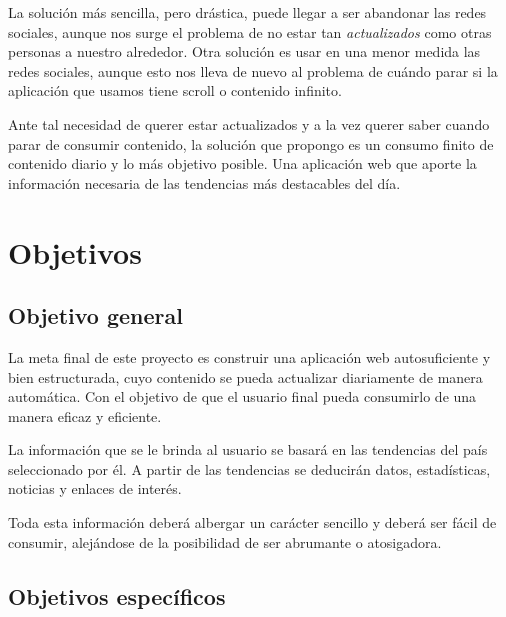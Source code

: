 \vspace{0.3cm}

La solución más sencilla, pero drástica, puede llegar a ser abandonar las redes sociales, aunque nos surge el problema de no estar tan \textit{actualizados} como otras personas a nuestro alrededor. Otra solución es usar en una menor medida las redes sociales, aunque esto nos lleva de nuevo al problema de cuándo parar si la aplicación que usamos tiene scroll o contenido infinito.

\vspace{0.3cm}

Ante tal necesidad de querer estar actualizados y a la vez querer saber cuando parar de consumir contenido, la solución que propongo es un consumo finito de contenido diario y lo más objetivo posible. Una aplicación web que aporte la información necesaria de las tendencias más destacables del día.

\section{Objetivos}

\subsection{Objetivo general}
La meta final de este proyecto es construir una aplicación web autosuficiente y bien estructurada, cuyo contenido se pueda actualizar diariamente de manera automática. Con el objetivo de que el usuario final pueda consumirlo de una manera eficaz y eficiente.

\vspace{0.3cm}

La información que se le brinda al usuario se basará en las tendencias del país seleccionado por él. A partir de las tendencias se deducirán datos, estadísticas, noticias y enlaces de interés.

\vspace{0.3cm}

Toda esta información deberá albergar un carácter sencillo y deberá ser fácil de consumir, alejándose de la posibilidad de ser abrumante o atosigadora.

\subsection{Objetivos específicos}

